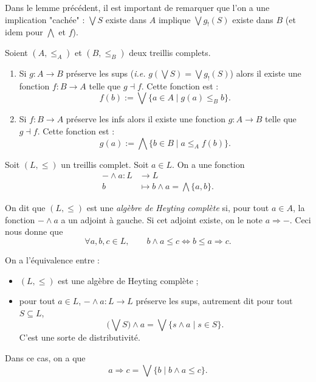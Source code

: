 \documentclass[./main]{subfiles}
\begin{document}
  \begin{rmk}
    Dans le lemme précédent, il est important de remarquer que l'on a une implication "cachée" :
    $\bigvee S$ existe dans $A$ implique $\bigvee g_!(S)$ existe dans  $B$ (et idem pour $\bigwedge$ et $f$).
  \end{rmk}

  \begin{lem}
    Soient $(A, \le_A)$ et $(B, \le_B)$ deux treillis complets.
    \begin{enumerate}
      \item Si $g : A \to B$ préserve les sups (\textit{i.e.} $g(\bigvee S) = \bigvee g_!(S)$) alors il existe une fonction $f : B \to A$ telle que $g \dashv f$.
        Cette fonction est :
        \[
        f(b) := \bigvee \{a \in A  \mid g(a) \le_B b\} 
        .\]
      \item Si $f : B \to A$ préserve les infs alors il existe une fonction $g : A \to B$ telle que $g \dashv f$.
        Cette fonction est :
        \[
        g(a) := \bigwedge \{b \in B  \mid a \le_A f(b)\} 
        .\] 
    \end{enumerate}
  \end{lem}

  \begin{exm}
    Soit $(L, \le)$ un treillis complet.
    Soit $a \in L$.
    On a une fonction 
     \begin{align*}
      - \wedge a: L &\longrightarrow L \\
      b &\longmapsto b \wedge a = \bigwedge \{a, b\} 
    .\end{align*}

    On dit que $(L, \le)$ est une \textit{algèbre de Heyting complète} si, pour tout $a \in A$, la fonction $- \wedge a$ a un adjoint à gauche.
    Si cet adjoint existe, on le note $a \Rightarrow -$.
    Ceci nous donne que 
    \[
    \forall a, b, c \in L, \quad\quad b \wedge a \le c \iff b \le a \Rightarrow c
    .\] 

    On a l'équivalence entre :
    \begin{itemize}
      \item $(L, \le)$ est une algèbre de Heyting complète ;
      \item pour tout $a \in L$, $- \wedge a : L \to L$ préserve les sups, autrement dit pour tout $S \subseteq L$, 
        \[
          \big(\bigvee S\big) \wedge a = \bigvee \{s \wedge a  \mid s \in S\} 
        .\] 
        C'est une sorte de distributivité.
    \end{itemize}
    Dans ce cas, on a que 
    \[
    a \Rightarrow c = \bigvee \{b  \mid b \wedge a \le c\}
    .\] 
  \end{exm}
\end{document}
